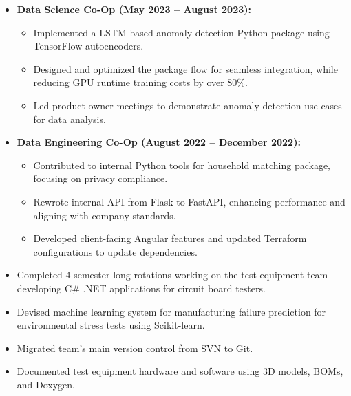 \documentclass[10pt,letterpaper,ragged2e]{altacv}
\begin{document}
\begin{itemize}
	\item \textbf{Data Science Co-Op (May 2023 -- August 2023):}
	      \begin{itemize}
		      \item Implemented a LSTM-based anomaly detection Python package using TensorFlow autoencoders.
		      \item Designed and optimized the package flow for seamless integration, while reducing GPU runtime training costs by over 80\%.
		      \item Led product owner meetings to demonstrate anomaly detection use cases for data analysis.
	      \end{itemize}
	\item \textbf{Data Engineering Co-Op (August 2022 -- December 2022):}
	      \begin{itemize}
		      \item Contributed to internal Python tools for household matching package, focusing on privacy compliance.
		      \item Rewrote internal API from Flask to FastAPI, enhancing performance and aligning with company standards.
		      \item Developed client-facing Angular features and updated Terraform configurations to update dependencies.
	      \end{itemize}
\end{itemize}

\divider

\begin{itemize}
	\begin{itemize}
		\item Completed 4 semester-long rotations working on the test equipment team developing C\# .NET applications for circuit board testers.
		\item Devised machine learning system for manufacturing failure prediction for environmental stress tests using Scikit-learn.
		\item Migrated team's main version control from SVN to Git.
		\item Documented test equipment hardware and software using 3D models, BOMs, and Doxygen.
	\end{itemize}
\end{itemize}
\end{document}
